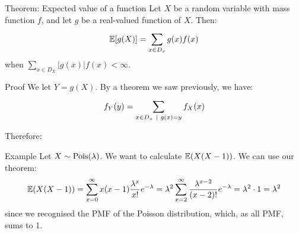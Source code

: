 \documentclass[a4paper]{article}
\begin{document}
\begin{parag}{Theorem: Expected value of a function}
    Let $X$ be a random variable with mass function $f$, and let $g$ be a real-valued function of $X$. Then: 
    \[\exval\left[g\left(X\right)\right] = \sum_{x \in D_x}^{} g\left(x\right)f\left(x\right)\]
    when $\sum_{x \in D_X}^{} \left|g\left(x\right)\right|f\left(x\right) < \infty$.

    \begin{subparag}{Proof}
        We let $Y = g\left(X\right)$. By a theorem we saw previously, we have: 
        \[f_Y\left(y\right) = \sum_{x \in D_x \suchthat g\left(x\right) = y}^{} f_X\left(x\right)\]
        
        Therefore: 
    \end{subparag}
\end{parag}

\begin{parag}{Example}
    Let $X \followsdistr \text{Pois}\left(\lambda\right)$. We want to calculate $\exval\left(X\left(X-1\right)\right)$. We can use our theorem: 
    \[\exval\left(X\left(X-1\right)\right) = \sum_{x=0}^{\infty} x\left(x-1\right) \frac{\lambda^x}{x!} e^{-\lambda} = \lambda^2 \sum_{x=2}^{\infty} \frac{\lambda^{x-2}}{\left(x-2\right)!} e^{-\lambda} = \lambda^2 \cdot  1 = \lambda ^2\]
    since we recognised the PMF of the Poisson distribution, which, as all PMF, sums to 1.
\end{parag}
\end{document}

